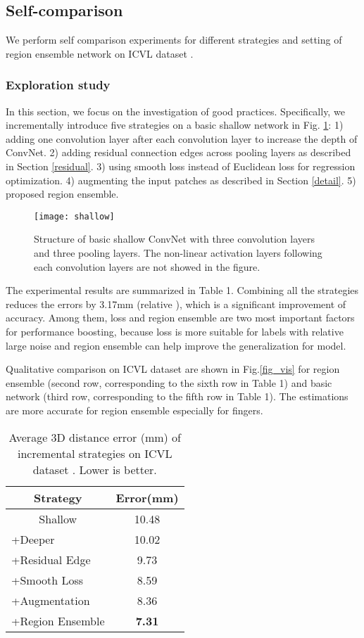 \documentclass[10pt,twocolumn,letterpaper]{article}
\begin{document}
\subsection{Self-comparison}
We perform self comparison experiments for different strategies and setting of region ensemble network on ICVL dataset \cite{tang2014latent}.

\subsubsection{Exploration study}
In this section, we focus on the investigation of good practices. Specifically, we incrementally introduce five strategies on a basic shallow network in Fig. \ref{fig_shallow}: 1) adding one convolution layer after each convolution layer to increase the depth of ConvNet. 2) adding residual connection edges across pooling layers as described in Section \ref{residual}. 3) using smooth  loss \cite{girshick2015fast} instead of Euclidean  loss for regression optimization. 4) augmenting the input patches as described in Section \ref{detail}. 5) proposed region ensemble.

\begin{figure}[htb]
\centering
{\texttt{[image: shallow]}}
\caption{Structure of basic shallow ConvNet with three convolution layers and three pooling layers. The non-linear activation layers following each convolution layers are not showed in the figure.}
\label{fig_shallow}
\end{figure}

The experimental results are summarized in Table 1. Combining all the strategies reduces the errors by 3.17mm (relative ), which is a significant improvement of accuracy. Among them,  loss and region ensemble are two most important factors for performance boosting, because  loss is more suitable for labels with relative large noise and region ensemble can help improve the generalization for model.

Qualitative comparison on ICVL dataset are shown in Fig.\ref{fig_vis} for region ensemble (second row, corresponding to the sixth row in Table 1) and basic network (third row, corresponding to the fifth row in Table 1). The estimations are more accurate for region ensemble especially for fingers.

\begin{table}[htb]
\label{table_add}
\caption{Average 3D distance error (mm) of incremental strategies on ICVL dataset \cite{tang2014latent}. Lower is better.}
\centering
\begin{tabular}{|l|c|}
\hline
\multicolumn{1}{|c|}{Strategy} & Error(mm) \\
\hline
\multicolumn{1}{|c|}{Shallow} & 10.48 \\
+Deeper & 10.02 \\
+Residual Edge & 9.73 \\
+Smooth  Loss & 8.59 \\
+Augmentation & 8.36 \\
+Region Ensemble & \textbf{7.31} \\
\hline
\end{tabular}
\end{table}
\end{document}
